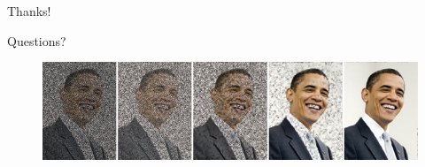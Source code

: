 \begin{frame}{Thanks!}
\begin{center}
\Large{Questions?}
\end{center}
\begin{figure}[h!]
\centering
\includegraphics[width=1\textwidth]{./Images/obama_compressed.jpg}
\end{figure}
\end{frame}

